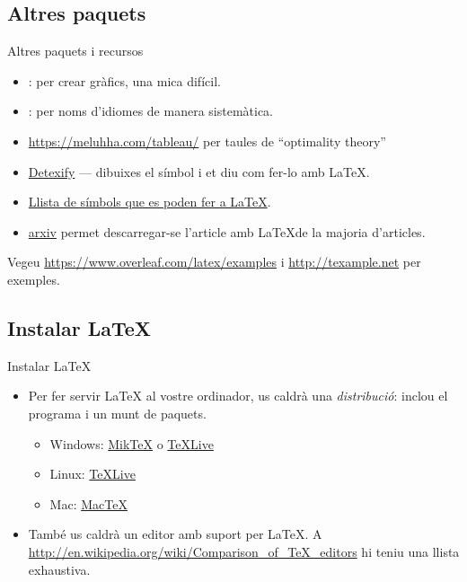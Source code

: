 \subsection{Altres paquets}
\begin{frame}{Altres paquets i recursos}
\begin{itemize}
    \item {}: per crear gràfics, una mica difícil.
    \item {}: per noms d'idiomes de manera sistemàtica.
    \item \url{https://meluhha.com/tableau/} per taules de ``optimality theory''
    \item \href{https://detexify.kirelabs.org/classify.html}{Detexify} --- dibuixes el símbol i et diu com fer-lo amb \LaTeX.
    \item \href{https://tug.ctan.org/info/symbols/comprehensive/symbols-a4.pdf}{Llista de símbols que es poden fer a \LaTeX}.
    \item \href{https://arxiv.org}{arxiv} permet descarregar-se l'article amb \LaTeX de la majoria d'articles.
\end{itemize}
Vegeu \url{https://www.overleaf.com/latex/examples} i \url{http://texample.net} 
per exemples.
\end{frame}

\subsection{Instalar \LaTeX{}}
\begin{frame}{Instalar \LaTeX}
\begin{itemize}
\item Per fer servir \LaTeX{} al vostre ordinador, us caldrà una \emph{distribució}:
    inclou el programa  i un munt de paquets.
\begin{itemize}
\item Windows: \href{http://miktex.org/}{Mik\TeX} o \href{http://tug.org/texlive/}{\TeX Live}
\item Linux: \href{http://tug.org/texlive/}{\TeX Live}
\item Mac: \href{http://tug.org/mactex/}{Mac\TeX}
\end{itemize}
\item També us caldrà un editor amb suport per \LaTeX{}. A \url{http://en.wikipedia.org/wiki/Comparison_of_TeX_editors} hi teniu una llista exhaustiva.
\end{itemize}
\end{frame}

